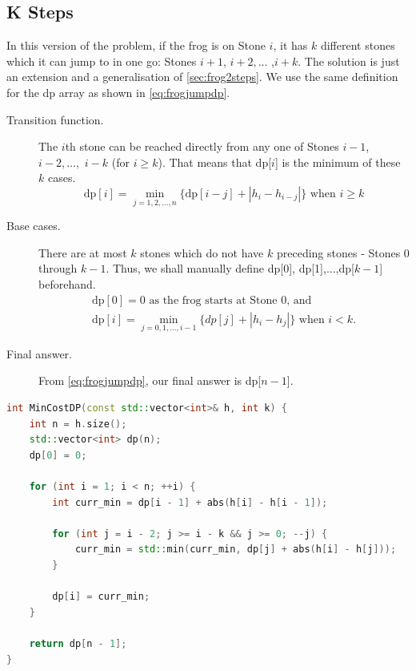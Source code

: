 \documentclass[12pt, a4paper]{article}
\theoremstyle{definition}
\theoremstyle{remark}
\begin{document}
\subsection{K Steps}
In this version of the problem, if the frog is on Stone $i$, it has $k$ different stones which it can jump to in one go: Stones $i+1$, $i+2,\ldots$ ,$i+k$.
The solution is just an extension and a generalisation of \cref{sec:frog2steps}.
We use the same definition for the dp array as shown in \cref{eq:frogjumpdp}.

\begin{description}
    \item[Transition function.] The $i$th stone can be reached directly from any one of Stones $i-1$, $i-2, \ldots,$ $i-k$ (for $i \geq k$). That means that dp[$i$] is the minimum of these $k$ cases.
        \begin{equation}
            \text{dp}[i] = \min_{j = 1,2,\ldots,n}\{\text{dp}[i-j] + |h_i - h_{i-j}|\} \text{ when } i \geq k
        \end{equation}
    \item[Base cases.] There are at most $k$ stones which do not have $k$ preceding stones - Stones 0 through $k-1$. Thus, we shall manually define dp[0], dp[1],...,dp[$k-1$] beforehand.
        \begin{gather}
            \text{dp}[0] = 0 \text{ as the frog starts at Stone 0, and} \\
            \text{dp}[i] = \min_{j = 0, 1, \ldots, i-1} \{ dp[j] + |h_i - h_j| \} \text{ when } i < k.
        \end{gather}
    \item[Final answer.] From \cref{eq:frogjumpdp}, our final answer is dp[$n-1$].
\end{description}

\begin{lstlisting}[language=C++]
int MinCostDP(const std::vector<int>& h, int k) {
    int n = h.size();
    std::vector<int> dp(n);
    dp[0] = 0;

    for (int i = 1; i < n; ++i) {
        int curr_min = dp[i - 1] + abs(h[i] - h[i - 1]);

        for (int j = i - 2; j >= i - k && j >= 0; --j) {
            curr_min = std::min(curr_min, dp[j] + abs(h[i] - h[j]));
        }

        dp[i] = curr_min;
    }

    return dp[n - 1];
}
\end{lstlisting}
\end{document}
